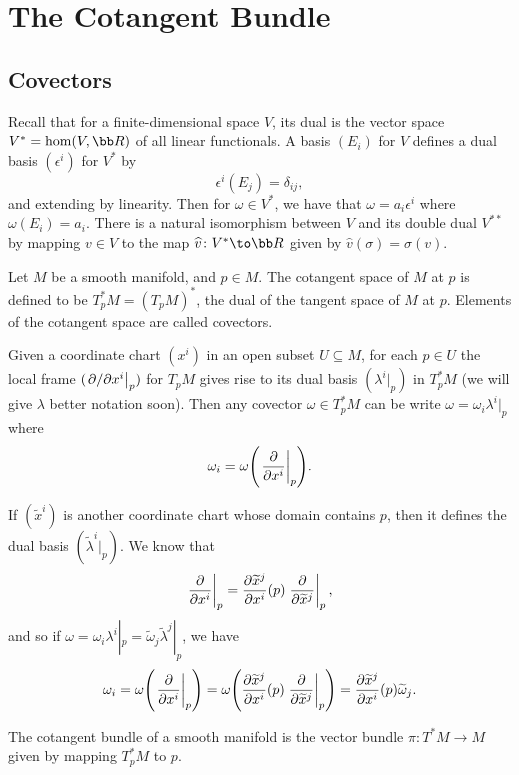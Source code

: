 \section{The Cotangent Bundle}

\subsection{Covectors}

Recall that for a finite-dimensional space $V$, its {\emphcolor dual} is the vector space $V^*=\hom(V,\bR)$ of all linear functionals.
A basis $(E_i)$ for $V$ defines a {\emphcolor dual basis} $(\epsilon^i)$ for $V^*$ by
$$ \epsilon^i(E_j) = \delta_{ij}, $$
and extending by linearity.
Then for $\omega\in V^*$, we have that $\omega=a_i\epsilon^i$ where $\omega(E_i)=a_i$.
There is a natural isomorphism between $V$ and its double dual $V^{**}$ by mapping $v\in V$ to the map $\hat v\colon V^*\to\bR$ given by $\hat v(\sigma)=\sigma(v)$.

\bdefn

    Let $M$ be a smooth manifold, and $p\in M$.
    The {\emphcolor cotangent space} of $M$ at $p$ is defined to be $T_p^*M=(T_pM)^*$, the dual of the tangent space of $M$ at $p$.
    Elements of the cotangent space are called {\emphcolor covectors}.

\edefn

Given a coordinate chart $(x^i)$ in an open subset $U\subseteq M$, for each $p\in U$ the local frame $(\left.\partial /\partial x^i\right|_p)$ for $T_pM$ gives rise to its dual basis
$(\lambda^i|_p)$ in $T_p^*M$ (we will give $\lambda$ better notation soon).
Then any covector $\omega\in T_p^*M$ can be write $\omega=\omega_i\lambda^i|_p$ where
$$ \omega_i = \omega\mathopen{}\mathclose{\left(\left.{{\partial }\over{\partial x^i}}\right|_p\right)} . $$

If $(\tilde x^i)$ is another coordinate chart whose domain contains $p$, then it defines the dual basis $(\tilde\lambda^i|_p)$.
We know that
$$ \left.{{\partial }\over{\partial x^i}}\right|_p = {{\partial \widetilde x^j}\over{\partial x^i}}(p)\left.{{\partial }\over{\partial \widetilde x^j}}\right|_p , $$
and so if $\omega=\omega_i\lambda^i|_p=\tilde\omega_j\tilde\lambda^j|_p$, we have
$$ \omega_i = \omega\mathopen{}\mathclose{\left(\left.{{\partial }\over{\partial x^i}}\right|_p\right)} = \omega\mathopen{}\mathclose{\left({{\partial \widetilde x^j}\over{\partial x^i}}(p)\left.{{\partial }\over{\partial \widetilde x^j}}\right|_p\right)} = {{\partial \widetilde x^j}\over{\partial x^i}}(p)\widetilde\omega_j . $$

\bdefn

    The {\emphcolor cotangent bundle} of a smooth manifold is the vector bundle $\pi\colon T^*M\to M$ given by mapping $T_p^*M$ to $p$.

\edefn

\bprop

